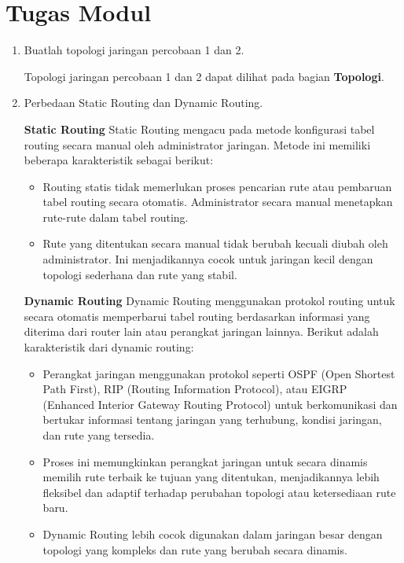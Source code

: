 \section*{Tugas Modul} %
\begin{enumerate}
    \item Buatlah topologi jaringan percobaan 1 dan 2.
    
    Topologi jaringan percobaan 1 dan 2 dapat dilihat pada bagian \textbf{Topologi}.

    \item Perbedaan Static Routing dan Dynamic Routing.
    
    \textbf{Static Routing}
    Static Routing mengacu pada metode konfigurasi tabel routing secara manual oleh administrator jaringan. Metode ini memiliki beberapa karakteristik sebagai berikut:
    \begin{itemize}
        \item Routing statis tidak memerlukan proses pencarian rute atau pembaruan tabel routing secara otomatis. Administrator secara manual menetapkan rute-rute dalam tabel routing.
        \item Rute yang ditentukan secara manual tidak berubah kecuali diubah oleh administrator. Ini menjadikannya cocok untuk jaringan kecil dengan topologi sederhana dan rute yang stabil.
    \end{itemize}

    \textbf{Dynamic Routing}
    Dynamic Routing menggunakan protokol routing untuk secara otomatis memperbarui tabel routing berdasarkan informasi yang diterima dari router lain atau perangkat jaringan lainnya. Berikut adalah karakteristik dari dynamic routing:
    \begin{itemize}
        \item Perangkat jaringan menggunakan protokol seperti OSPF (Open Shortest Path First), RIP (Routing Information Protocol), atau EIGRP (Enhanced Interior Gateway Routing Protocol) untuk berkomunikasi dan bertukar informasi tentang jaringan yang terhubung, kondisi jaringan, dan rute yang tersedia.
        \item Proses ini memungkinkan perangkat jaringan untuk secara dinamis memilih rute terbaik ke tujuan yang ditentukan, menjadikannya lebih fleksibel dan adaptif terhadap perubahan topologi atau ketersediaan rute baru.
        \item Dynamic Routing lebih cocok digunakan dalam jaringan besar dengan topologi yang kompleks dan rute yang berubah secara dinamis.
    \end{itemize}


\end{enumerate}
